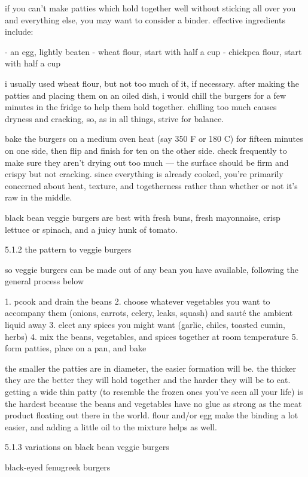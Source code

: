 if you can't make patties which hold together well without sticking all over you and everything else, you may want to consider a binder. effective ingredients include:

	- an egg, lightly beaten
	- wheat flour, start with half a cup
	- chickpea flour, start with half a cup

i usually used wheat flour, but not too much of it, if necessary. after making the patties and placing them on an oiled dish, i would chill the burgers for a few minutes in the fridge to help them hold together. chilling too much causes dryness and cracking, so, as in all things, strive for balance.

bake the burgers on a medium oven heat (say 350 F or 180 C) for fifteen minutes on one side, then flip and finish for ten on the other side. check frequently to make sure they aren't drying out too much --- the surface should be firm and crispy but not cracking. since everything is already cooked, you're primarily concerned about heat, texture, and togetherness rather than whether or not it's raw in the middle.

black bean veggie burgers are best with fresh buns, fresh mayonnaise, crisp lettuce or spinach, and a juicy hunk of tomato.

5.1.2  the pattern to veggie burgers

so veggie burgers can be made out of any bean you have available, following the general process below

1.	pcook and drain the beans
2.	choose whatever vegetables you want to accompany them (onions, carrots, celery, leaks, squash) and saut\'{e} the ambient liquid away
3.	elect any spices you might want (garlic, chiles, toasted cumin, herbs)
4.	mix the beans, vegetables, and spices together at room temperature
5.	form patties, place on a pan, and bake

the smaller the patties are in diameter, the easier formation will be. the thicker they are the better they will hold together and the harder they will be to eat. getting a wide thin patty (to resemble the frozen ones you've seen all your life) is the hardest because the beans and vegetables have no glue as strong as the meat product floating out there in the world. flour and/or egg make the binding a lot easier, and adding a little oil to the mixture helps as well.

5.1.3  variations on black bean veggie burgers

black-eyed fenugreek burgers


